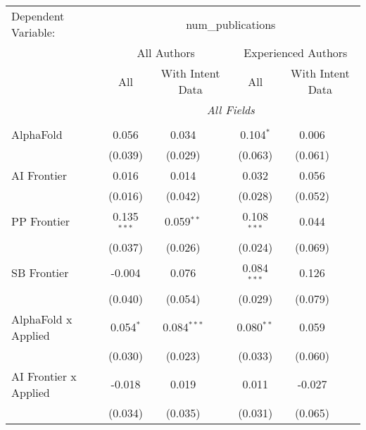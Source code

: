 \begingroup
\centering
\begin{tabular}{lcccccc}
   \tabularnewline \midrule \midrule
   Dependent Variable: & \multicolumn{6}{c}{num\_publications}\\
 & \multicolumn{3}{c}{All Authors} & \multicolumn{3}{c}{Experienced Authors} \\
\cmidrule(lr){2-4} \cmidrule(lr){5-7}
 & \multicolumn{1}{c}{All} & \multicolumn{2}{c}{With Intent Data} & \multicolumn{1}{c}{All} & \multicolumn{2}{c}{With Intent Data} \\
\cmidrule(lr){2-2} \cmidrule(lr){3-4} \cmidrule(lr){5-5} \cmidrule(lr){6-7}
 & \multicolumn{6}{c}{\textit{All Fields}} \\ \\
   AlphaFold                      & 0.056         & 0.034         &               & 0.104$^{*}$   & 0.006   &   \\   
                                  & (0.039)       & (0.029)       &               & (0.063)       & (0.061) &   \\   
   AI Frontier                    & 0.016         & 0.014         &               & 0.032         & 0.056   &   \\   
                                  & (0.016)       & (0.042)       &               & (0.028)       & (0.052) &   \\   
   PP Frontier                    & 0.135$^{***}$ & 0.059$^{**}$  &               & 0.108$^{***}$ & 0.044   &   \\   
                                  & (0.037)       & (0.026)       &               & (0.024)       & (0.069) &   \\   
   SB Frontier                    & -0.004        & 0.076         &               & 0.084$^{***}$ & 0.126   &   \\   
                                  & (0.040)       & (0.054)       &               & (0.029)       & (0.079) &   \\   
   AlphaFold x Applied            & 0.054$^{*}$   & 0.084$^{***}$ &               & 0.080$^{**}$  & 0.059   &   \\   
                                  & (0.030)       & (0.023)       &               & (0.033)       & (0.060) &   \\   
   AI Frontier x Applied          & -0.018        & 0.019         &               & 0.011         & -0.027  &   \\   
                                  & (0.034)       & (0.035)       &               & (0.031)       & (0.065) &   \\   

\end{tabular}
